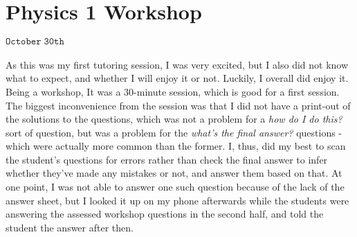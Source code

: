 \section{Physics 1 Workshop}
\begin{flushright}
$\mathtt{October \; 30th}$
\end{flushright}
\paragraph{}

As this was my first tutoring session, I was very excited, but I also did not know what to expect, and whether I will enjoy it or not. Luckily, I overall did enjoy it. Being a workshop, It was a 30-minute session, which is good for a first session. The biggest inconvenience from the session was that I did not have a print-out of the solutions to the questions, which was not a problem for a \emph{how do I do this?} sort of question, but was a problem for the \emph{what's the final answer?} questions - which were actually more common than the former. I, thus, did my best to scan the student's questions for errors rather than check the final answer to infer whether they've made any mistakes or not, and answer them based on that. At one point, I was not able to answer one such question because of the lack of the answer sheet, but I looked it up on my phone afterwards while the students were answering the assessed workshop questions in the second half, and told the student the answer after then. 
